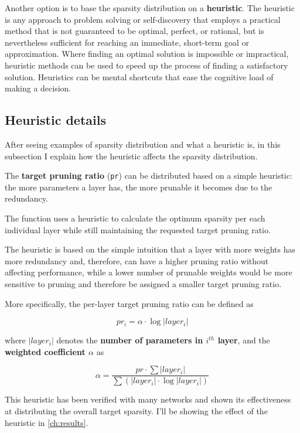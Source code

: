 Another option is to base the sparsity distribution on a \textbf{heuristic}.
The heuristic is any approach to problem solving or self-discovery that employs
a practical method that is not guaranteed to be optimal, perfect, or rational,
but is nevertheless sufficient for reaching an immediate, short-term goal or
approximation.
Where finding an optimal solution is impossible or impractical, heuristic
methods can be used to speed up the process of finding a satisfactory solution.
Heuristics can be mental shortcuts that ease the cognitive load of making a
decision.\cite{heuristic}

\subsection{Heuristic details}
After seeing examples of sparsity distribution and what a heuristic is, in this
subsection I explain how the heuristic affects the sparsity distribution.

The \textbf{target pruning ratio} (\texttt{pr}) can be distributed based on a
simple heuristic: the more parameters a layer has, the more prunable it becomes
due to the redundancy.

The function uses a heuristic to calculate the optimum sparsity per each
individual layer while still maintaining the requested target pruning ratio.

The heuristic is based on the simple intuition that a layer with more weights
has more redundancy and, therefore, can have a higher pruning ratio without
affecting performance, while a lower number of prunable weights would be more
sensitive to pruning and therefore be assigned a smaller target pruning ratio.

More specifically, the per-layer target pruning ratio can be defined as

\begin{equation}
    pr_i = \alpha \cdot \log|layer_i|
\end{equation}

where $|layer_i|$ denotes the \textbf{number of parameters in $i^{th}$ layer},
and the \textbf{weighted coefficient $\alpha$} as

\begin{equation}
    \alpha = \frac{pr \cdot \sum|layer_i|}{\sum(|layer_i| \cdot \log|layer_i|)}
\end{equation}

This heuristic has been verified with many networks and shown its effectiveness
at distributing the overall target sparsity. I'll be showing the effect of the
heuristic in \autoref{ch:results}.

